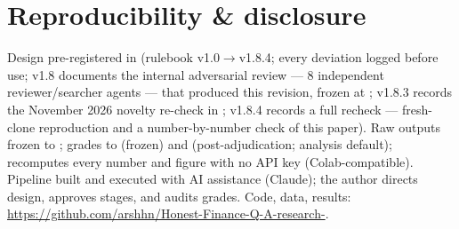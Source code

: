 \documentclass[11pt]{article}
\begin{document}
\section{Reproducibility \& disclosure}

Design pre-registered in  (rulebook v1.0$\rightarrow$v1.8.4; every deviation logged before use; v1.8 documents the internal adversarial review --- 8 independent reviewer/searcher agents --- that produced this revision, frozen at ; v1.8.3 records the November 2026 novelty re-check in ; v1.8.4 records a full recheck --- fresh-clone reproduction and a number-by-number check of this paper). Raw outputs frozen to ; grades to  (frozen) and  (post-adjudication; analysis default);  recomputes every number and figure with no API key (Colab-compatible). Pipeline built and executed with AI assistance (Claude); the author directs design, approves stages, and audits grades. Code, data, results: \url{https://github.com/arshhn/Honest-Finance-Q-A-research-}.
\end{document}
